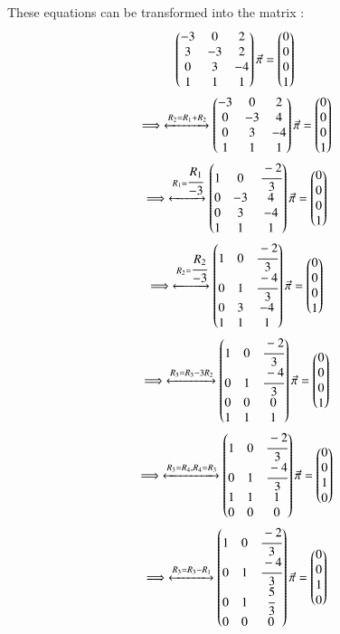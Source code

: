 \begin{enumerate}
These equations can be transformed into the matrix :
\begin{multline}
    \myvec{-3&0&2\\3&-3&2\\0&3&-4\\1&1&1}\Vec{\pi}=\myvec{0\\0\\0\\1}
\\
    \implies\xleftrightarrow{R_{2}=R_{1}+R_{2}}\myvec{-3&0&2\\0&-3&4\\0&3&-4\\1&1&1}\Vec{\pi}=\myvec{0\\0\\0\\1}
\\
    \implies\xleftrightarrow{R_{1}=\cfrac{R_{1}}{-3}}\myvec{1&0&\cfrac{-2}{3}\\0&-3&4\\0&3&-4\\1&1&1}\Vec{\pi}=\myvec{0\\0\\0\\1}
\\
    \implies\xleftrightarrow{R_{2}=\cfrac{R_{2}}{-3}}\myvec{1&0&\cfrac{-2}{3}\\0&1&\cfrac{-4}{3}\\0&3&-4\\1&1&1}\Vec{\pi}=\myvec{0\\0\\0\\1}
\\
    \implies\xleftrightarrow{R_{3}=R_{3}-3R_{2}}\myvec{1&0&\cfrac{-2}{3}\\0&1&\cfrac{-4}{3}\\0&0&0\\1&1&1}\Vec{\pi}=\myvec{0\\0\\0\\1}
\\
    \implies\xleftrightarrow{R_{3}=R_{4} ,R_{4}=R_{3}}\myvec{1&0&\cfrac{-2}{3}\\0&1&\cfrac{-4}{3}\\1&1&1\\0&0&0}\Vec{\pi}=\myvec{0\\0\\1\\0}
\\
    \implies\xleftrightarrow{R_{3}=R_{3}-R_{1}}\myvec{1&0&\cfrac{-2}{3}\\0&1&\cfrac{-4}{3}\\0&1&\cfrac{5}{3}\\0&0&0}\Vec{\pi}=\myvec{0\\0\\1\\0}

\end{multline}
\end{enumerate}
